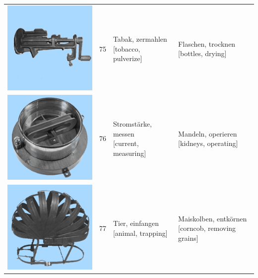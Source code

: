\documentclass[
  english,
  man,floatsintext]{apa7}
\begin{document}
\begin{center}
\begin{ThreePartTable}
{\begin{longtable}{llll}
\includegraphics[valign=c, scale=0.23]{../materials/unfamiliar/75.png} & 75 & \makecell[l]{Tabak, zermahlen\\{[tobacco, pulverize]}} & \makecell[l]{Flaschen, trocknen\\{[bottles, drying]}}\\
\includegraphics[valign=c, scale=0.23]{../materials/unfamiliar/76.png} & 76 & \makecell[l]{Stromstärke, messen\\{[current, measuring]}} & \makecell[l]{Mandeln, operieren\\{[kidneys, operating]}}\\
\includegraphics[valign=c, scale=0.23]{../materials/unfamiliar/77.png} & 77 & \makecell[l]{Tier, einfangen\\{[animal, trapping]}} & \makecell[l]{Maiskolben, entkörnen\\{[corncob, removing grains]}}\\

\end{longtable}}
\end{ThreePartTable}
\end{center}
\end{document}
